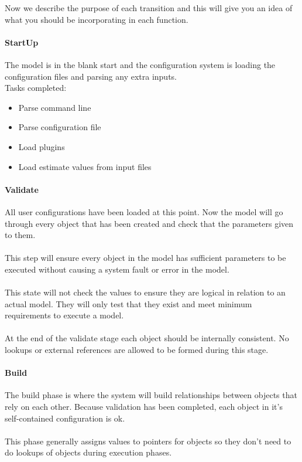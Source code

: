 Now we describe the purpose of each transition and this will give you an idea of what you should be incorporating in each function.

\paragraph*{StartUp}
The model is in the blank start and the configuration system is loading the configuration files and parsing any extra inputs.
\\
Tasks completed:
\begin{itemize}
	\item Parse command line
	\item Parse configuration file
	\item Load plugins
	\item Load estimate values from input files
\end{itemize}

\paragraph*{Validate}
All user configurations have been loaded at this point. Now the model will go through every object that has been created and check that the parameters given to them.
\\\\
This step will ensure every object in the model has sufficient parameters to be executed without causing a system fault or error in the model.
\\\\
This state will not check the values to ensure they are logical in relation to an actual model. They will only test that they exist and meet minimum requirements to execute a model.
\\\\
At the end of the validate stage each object should be internally consistent. No lookups or external references are allowed to be formed during this stage.

\paragraph*{Build}
The build phase is where the system will build relationships between objects that rely on each other. Because validation has been completed, each object in it's self-contained configuration is ok.
\\\\
This phase generally assigns values to pointers for objects so they don't need to do lookups of objects during execution phases.

